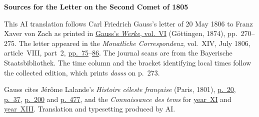 \clearpage\thispagestyle{empty}
\begin{center}\textbf{Sources for the Letter on the Second Comet of 1805}\end{center}
\noindent This AI translation follows Carl Friedrich Gauss’s letter of 20 May 1806 to Franz Xaver von Zach as printed in \href{https://gdz.sub.uni-goettingen.de/id/PPN236007467}{Gauss’s \textit{Werke}, vol.~VI} (Göttingen, 1874), pp.~270--275. The letter appeared in the \textit{Monatliche Correspondenz}, vol.~XIV, July 1806, article~VIII, part~2, \href{https://www.digitale-sammlungen.de/en/view/bsb10538606?page=85}{pp.~75}--\href{https://www.digitale-sammlungen.de/en/view/bsb10538606?page=96}{86}. The journal scans are from the Bayerische Staatsbibliothek. The time column and the bracket identifying local times follow the collected edition, which prints \textit{dasss} on p.~273.
\par\medskip
Gauss cites Jérôme Lalande’s \textit{Histoire céleste française} (Paris, 1801), \href{https://archive.org/details/histoireclestef00lalagoog/page/n47/mode/1up}{p.~20}, \href{https://archive.org/details/histoireclestef00lalagoog/page/n64/mode/1up}{p.~37}, \href{https://archive.org/details/histoireclestef00lalagoog/page/n227/mode/1up}{p.~200} and \href{https://archive.org/details/histoireclestef00lalagoog/page/n516/mode/1up}{p.~477}, and the \textit{Connaissance des tems} for \href{https://cdt.imcce.fr/items/show/152}{year~XI} and \href{https://cdt.imcce.fr/items/show/154}{year~XIII}. Translation and typesetting produced by AI.
\clearpage
